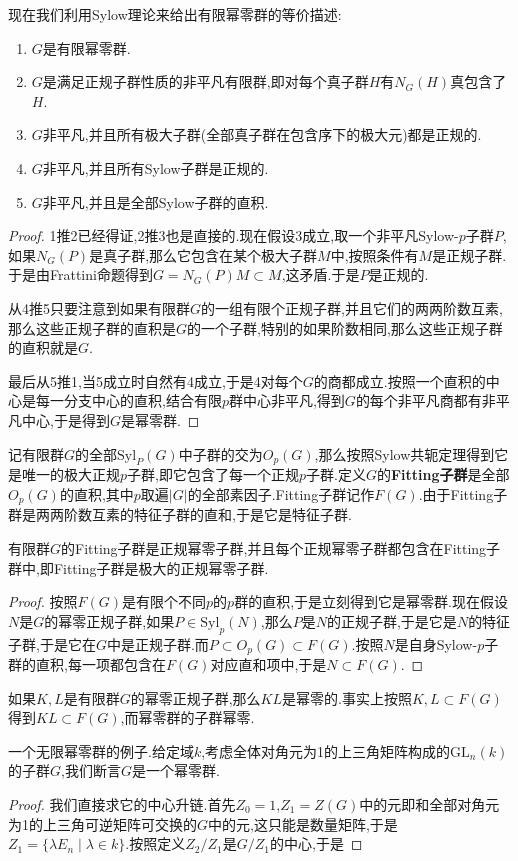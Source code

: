 现在我们利用Sylow理论来给出有限幂零群的等价描述:
\begin{enumerate}
	\item $G$是有限幂零群.
	\item $G$是满足正规子群性质的非平凡有限群,即对每个真子群$H$有$N_G(H)$真包含了$H$.
	\item $G$非平凡,并且所有极大子群(全部真子群在包含序下的极大元)都是正规的.
	\item $G$非平凡,并且所有Sylow子群是正规的.
	\item $G$非平凡,并且是全部Sylow子群的直积.
\end{enumerate}
\begin{proof}
	
	1推2已经得证,2推3也是直接的.现在假设3成立,取一个非平凡Sylow-$p$子群$P$,如果$N_G(P)$是真子群,那么它包含在某个极大子群$M$中,按照条件有$M$是正规子群.于是由Frattini命题得到$G=N_G(P)M\subset M$,这矛盾.于是$P$是正规的.
	
	从4推5只要注意到如果有限群$G$的一组有限个正规子群,并且它们的两两阶数互素,那么这些正规子群的直积是$G$的一个子群,特别的如果阶数相同,那么这些正规子群的直积就是$G$.
	
	最后从5推1,当5成立时自然有4成立,于是4对每个$G$的商都成立.按照一个直积的中心是每一分支中心的直积,结合有限$p$群中心非平凡,得到$G$的每个非平凡商都有非平凡中心,于是得到$G$是幂零群.
\end{proof}

记有限群$G$的全部$\mathrm{Syl}_P(G)$中子群的交为$O_p(G)$,那么按照Sylow共轭定理得到它是唯一的极大正规$p$子群,即它包含了每一个正规$p$子群.定义$G$的\textbf{Fitting子群}是全部$O_p(G)$的直积,其中$p$取遍$|G|$的全部素因子.Fitting子群记作$F(G)$.由于Fitting子群是两两阶数互素的特征子群的直和,于是它是特征子群.

有限群$G$的Fitting子群是正规幂零子群,并且每个正规幂零子群都包含在Fitting子群中,即Fitting子群是极大的正规幂零子群.
\begin{proof}
	
	按照$F(G)$是有限个不同$p$的$p$群的直积,于是立刻得到它是幂零群.现在假设$N$是$G$的幂零正规子群,如果$P\in\mathrm{Syl}_p(N)$,那么$P$是$N$的正规子群,于是它是$N$的特征子群,于是它在$G$中是正规子群.而$P\subset O_p(G)\subset F(G)$.按照$N$是自身Sylow-$p$子群的直积,每一项都包含在$F(G)$对应直和项中,于是$N\subset F(G)$.
\end{proof}

如果$K,L$是有限群$G$的幂零正规子群,那么$KL$是幂零的.事实上按照$K,L\subset F(G)$得到$KL\subset F(G)$,而幂零群的子群幂零.

一个无限幂零群的例子.给定域$k$,考虑全体对角元为1的上三角矩阵构成的$\mathrm{GL}_n(k)$的子群$G$,我们断言$G$是一个幂零群.
\begin{proof}
	
	我们直接求它的中心升链.首先$Z_0=1$,$Z_1=Z(G)$中的元即和全部对角元为1的上三角可逆矩阵可交换的$G$中的元,这只能是数量矩阵,于是$Z_1=\{\lambda E_n\mid \lambda\in k\}$.按照定义$Z_2/Z_1$是$G/Z_1$的中心,于是
\end{proof}


